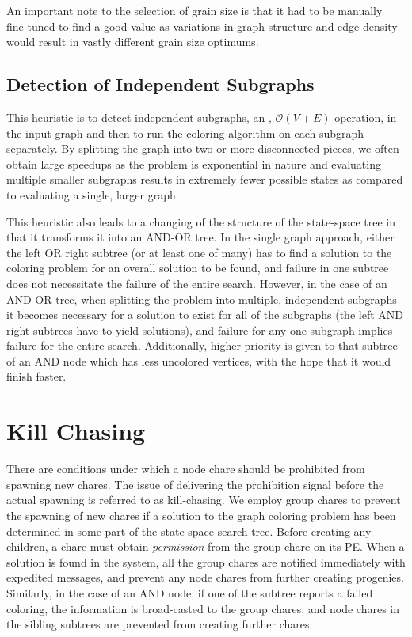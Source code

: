 \documentclass[10pt,oneside]{article}
\begin{document}
  An important note to the selection of grain size is that it had
  to be manually fine-tuned to find a good value as variations in graph
  structure and edge density would result in vastly different grain size
  optimums.

\subsection{Detection of Independent Subgraphs}   
This heuristic is to detect independent subgraphs, an , $\mathcal{O}(V+E)$
operation, in the input graph and then to run the coloring algorithm on each
subgraph separately.  By splitting the graph into two or more disconnected pieces,
we often obtain large speedups as the problem is exponential in nature and
evaluating multiple smaller subgraphs results in extremely fewer possible states
as compared to evaluating a single, larger graph. 

This heuristic also leads to a changing of the structure of the state-space tree 
in that it transforms it into an AND-OR tree. In the single graph approach, 
either the left OR right subtree (or at least one of many) has to find a solution 
to the coloring problem for an overall solution to be found, and failure in one subtree
does not necessitate the failure of the entire search. However, in the case of an AND-OR tree, when
splitting the problem into multiple, independent subgraphs it becomes necessary
for a solution to exist for all of the subgraphs (the left AND right subtrees
    have to yield solutions), and failure for any one subgraph implies failure for
  the entire search. Additionally, higher priority is given to that subtree of an
    AND node which has less uncolored vertices, with the hope that it would finish faster. 

  \section{Kill Chasing}
   \label{sec:killchasing}  
    There are conditions under which a node chare should be prohibited from spawning new chares. The issue of
    delivering the prohibition signal before the actual spawning is referred to as kill-chasing.
    We employ group chares to prevent the spawning of new chares
    if a solution to the graph coloring problem has been determined in some part of the state-space search tree. 
    Before creating any children, a chare must obtain \emph{permission} from the group chare on its PE. 
    When a solution is found in the system, all the group chares are notified immediately with expedited messages, 
    and prevent any node chares from further creating progenies. Similarly, in the case of an AND node, if one of the
    subtree reports a failed coloring, the information is broad-casted to the group chares, and node chares in the sibling 
    subtrees are prevented from creating further chares.
\end{document}
